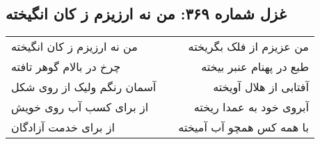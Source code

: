 \begin{center}
\section*{غزل شماره ۳۶۹: من نه ارزیزم ز کان انگیخته}
\label{sec:369}
\begin{longtable}{l p{0.5cm} r}
من نه ارزیزم ز کان انگیخته
&&
من عزیزم از فلک بگریخته
\\
چرخ در بالام گوهر تافته
&&
طبع در پهنام عنبر بیخته
\\
آسمان رنگم ولیک از روی شکل
&&
آفتابی از هلال آویخته
\\
از برای کسب آب روی خویش
&&
آبروی خود به عمدا ریخته
\\
از برای خدمت آزادگان
&&
با همه کس همچو آب آمیخته
\\
\end{longtable}
\end{center}
